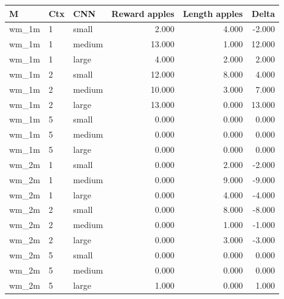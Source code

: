 \begin{tabular}{lllrrr}
\toprule
M & Ctx & CNN & Reward apples & Length apples & Delta \\
\midrule
wm\_1m & 1 & small & 2.000 & 4.000 & -2.000 \\
wm\_1m & 1 & medium & 13.000 & 1.000 & 12.000 \\
wm\_1m & 1 & large & 4.000 & 2.000 & 2.000 \\
wm\_1m & 2 & small & 12.000 & 8.000 & 4.000 \\
wm\_1m & 2 & medium & 10.000 & 3.000 & 7.000 \\
wm\_1m & 2 & large & 13.000 & 0.000 & 13.000 \\
wm\_1m & 5 & small & 0.000 & 0.000 & 0.000 \\
wm\_1m & 5 & medium & 0.000 & 0.000 & 0.000 \\
wm\_1m & 5 & large & 0.000 & 0.000 & 0.000 \\
wm\_2m & 1 & small & 0.000 & 2.000 & -2.000 \\
wm\_2m & 1 & medium & 0.000 & 9.000 & -9.000 \\
wm\_2m & 1 & large & 0.000 & 4.000 & -4.000 \\
wm\_2m & 2 & small & 0.000 & 8.000 & -8.000 \\
wm\_2m & 2 & medium & 0.000 & 1.000 & -1.000 \\
wm\_2m & 2 & large & 0.000 & 3.000 & -3.000 \\
wm\_2m & 5 & small & 0.000 & 0.000 & 0.000 \\
wm\_2m & 5 & medium & 0.000 & 0.000 & 0.000 \\
wm\_2m & 5 & large & 1.000 & 0.000 & 1.000 \\
\bottomrule
\end{tabular}
